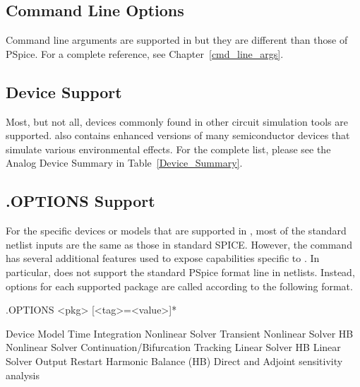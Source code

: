 \subsection{Command Line Options}
Command line arguments are supported in \Xyce{} but they are different than
those of PSpice.   For a complete reference, see Chapter~\ref{cmd_line_args}.

\subsection{Device Support}
Most, but not all, devices commonly found in other
circuit simulation tools are supported.  \Xyce{} also contains enhanced versions of
many semiconductor devices that simulate various environmental effects.  For the
complete list, please see the
Analog Device Summary in Table~\ref{Device_Summary}.

\subsection{ .OPTIONS Support}
For the specific devices or models that are supported in \Xyce{}, most of the
standard netlist inputs are the same as those in standard SPICE.
However, the  command has several additional features used to
expose capabilities specific to \Xyce{}.  In particular, \Xyce{} does not
support the standard PSpice format  line in netlists.
Instead, options for each supported package are called according to the
following format.

\begin{Command}
\format
.OPTIONS <pkg> [<tag>=<value>]*

\arguments

\begin{Arguments}
       Device Model
      Time Integration
       Nonlinear Solver
  Transient Nonlinear Solver
    HB Nonlinear Solver
         Continuation/Bifurcation Tracking
       Linear Solver
    HB Linear Solver
       Output
      Restart
        Harmonic Balance (HB)
  Direct and Adjoint sensitivity analysis
\end{Arguments}

\end{Command}

